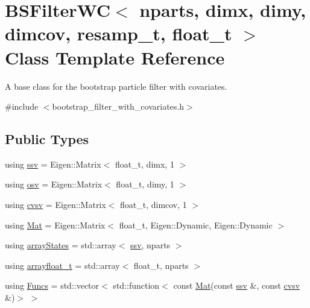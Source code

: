 \hypertarget{classBSFilterWC}{}\section{B\+S\+Filter\+WC$<$ nparts, dimx, dimy, dimcov, resamp\+\_\+t, float\+\_\+t $>$ Class Template Reference}
\label{classBSFilterWC}


A base class for the bootstrap particle filter with covariates.  




{\ttfamily \#include $<$bootstrap\+\_\+filter\+\_\+with\+\_\+covariates.\+h$>$}

\subsection*{Public Types}
\begin{DoxyCompactItemize}
\item 
using \hyperlink{classBSFilterWC_afff292a8cc15505cc3aa244135203c78}{ssv} = Eigen\+::\+Matrix$<$ float\+\_\+t, dimx, 1 $>$
\item 
using \hyperlink{classBSFilterWC_a48b0c7f1a1cf7e57300cf820e74057ce}{osv} = Eigen\+::\+Matrix$<$ float\+\_\+t, dimy, 1 $>$
\item 
using \hyperlink{classBSFilterWC_a52f5a46901a821fffe82937543220a1a}{cvsv} = Eigen\+::\+Matrix$<$ float\+\_\+t, dimcov, 1 $>$
\item 
using \hyperlink{classBSFilterWC_a507a06203a27e3a025a43be68b4b0e0e}{Mat} = Eigen\+::\+Matrix$<$ float\+\_\+t, Eigen\+::\+Dynamic, Eigen\+::\+Dynamic $>$
\item 
using \hyperlink{classBSFilterWC_af89dac8c324ae8b549595a85e89ec7da}{array\+States} = std\+::array$<$ \hyperlink{classBSFilterWC_afff292a8cc15505cc3aa244135203c78}{ssv}, nparts $>$
\item 
using \hyperlink{classBSFilterWC_a12c3f32cb628a0efaa0267262205d6d6}{arrayfloat\+\_\+t} = std\+::array$<$ float\+\_\+t, nparts $>$
\item 
using \hyperlink{classBSFilterWC_a984a5a75eef118f2f4db7f8953fea653}{Funcs} = std\+::vector$<$ std\+::function$<$ const \hyperlink{classBSFilterWC_a507a06203a27e3a025a43be68b4b0e0e}{Mat}(const \hyperlink{classBSFilterWC_afff292a8cc15505cc3aa244135203c78}{ssv} \&, const \hyperlink{classBSFilterWC_a52f5a46901a821fffe82937543220a1a}{cvsv} \&)$>$ $>$
\end{DoxyCompactItemize}
